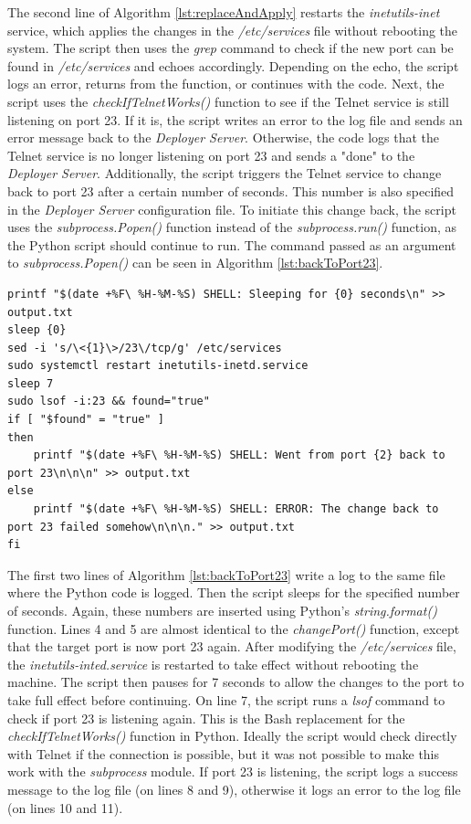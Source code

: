 The second line of Algorithm \ref{lst:replaceAndApply} restarts the \textit{inetutils-inet} service, which applies the changes in the \textit{/etc/services} file without rebooting the system. The script then uses the \textit{grep} command to check if the new port can be found in \textit{/etc/services} and echoes accordingly. Depending on the echo, the script logs an error, returns from the function, or continues with the code. Next, the script uses the \textit{checkIfTelnetWorks()} function to see if the Telnet service is still listening on port 23. If it is, the script writes an error to the log file and sends an error message back to the \textit{Deployer Server}. Otherwise, the code logs that the Telnet service is no longer listening on port 23 and sends a "done" to the \textit{Deployer Server}. Additionally, the script triggers the Telnet service to change back to port 23 after a certain number of seconds. This number is also specified in the \textit{Deployer Server} configuration file. 
To initiate this change back, the script uses the \textit{subprocess.Popen()} function instead of the \textit{subprocess.run()} function, as the Python script should continue to run. The command passed as an argument to \textit{subprocess.Popen()} can be seen in Algorithm \ref{lst:backToPort23}.
\\

 \begin{lstlisting}[caption={The Bash Commands to Change Back to the Telnet Service Port 23 Afer a Given Number of Seconds},label={lst:backToPort23}]
printf "$(date +%F\ %H-%M-%S) SHELL: Sleeping for {0} seconds\n" >> output.txt
sleep {0}
sed -i 's/\<{1}\>/23\/tcp/g' /etc/services
sudo systemctl restart inetutils-inetd.service
sleep 7
sudo lsof -i:23 && found="true"
if [ "$found" = "true" ]
then
    printf "$(date +%F\ %H-%M-%S) SHELL: Went from port {2} back to port 23\n\n\n" >> output.txt
else
    printf "$(date +%F\ %H-%M-%S) SHELL: ERROR: The change back to port 23 failed somehow\n\n\n." >> output.txt
fi       
\end{lstlisting}

The first two lines of Algorithm \ref{lst:backToPort23} write a log to the same file where the Python code is logged. Then the script sleeps for the specified number of seconds. Again, these numbers are inserted using Python's \textit{string.format()} function. Lines 4 and 5 are almost identical to the \textit{changePort()} function, except that the target port is now port 23 again. After modifying the \textit{/etc/services} file, the \textit{inetutils-inted.service} is restarted to take effect without rebooting the machine. The script then pauses for 7 seconds to allow the changes to the port to take full effect before continuing. On line 7, the script runs a \textit{lsof} command to check if port 23 is listening again. This is the Bash replacement for the \textit{checkIfTelnetWorks()} function in Python. Ideally the script would check directly with Telnet if the connection is possible, but it was not possible to make this work with the \textit{subprocess} module. If port 23 is listening, the script logs a success message to the log file (on lines 8 and 9), otherwise it logs an error to the log file (on lines 10 and 11). 


